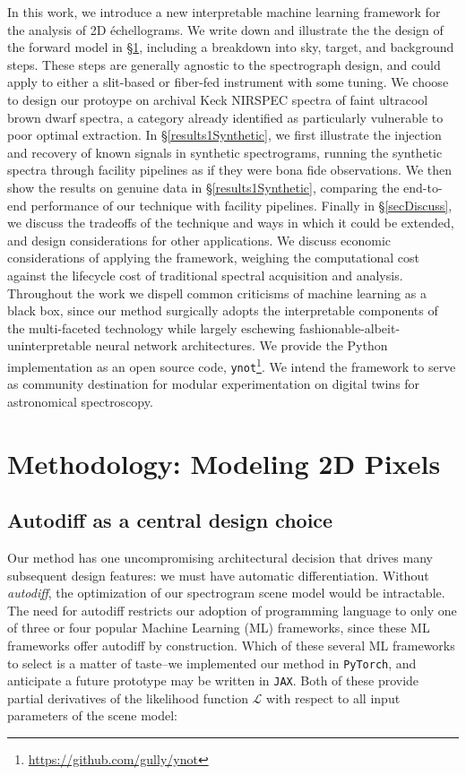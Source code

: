 \documentclass[twocolumn]{aastex63}
\begin{document}
In this work, we introduce a new interpretable machine learning framework for the analysis of 2D \'echellograms.  We write down and illustrate the the design of the forward model in \S \ref{secMethod}, including a breakdown into sky, target, and background steps.  These steps are generally agnostic to the spectrograph design, and could apply to either a slit-based or fiber-fed instrument with some tuning.  We choose to design our protoype on archival Keck NIRSPEC spectra of faint ultracool brown dwarf spectra, a category already identified as particularly vulnerable to poor optimal extraction.  In \S \ref{results1Synthetic}, we first illustrate the injection and recovery of known signals in synthetic spectrograms, running the synthetic spectra through facility pipelines as if they were bona fide observations.  We then show the results on genuine data in \S \ref{results1Synthetic}, comparing the end-to-end performance of our technique with facility pipelines.  Finally in \S \ref{secDiscuss}, we discuss the tradeoffs of the technique and ways in which it could be extended, and design considerations for other applications.  We discuss economic considerations of applying the framework, weighing the computational cost against the lifecycle cost of traditional spectral acquisition and analysis.  Throughout the work we dispell common criticisms of machine learning as a black box, since our method surgically adopts the interpretable components of the multi-faceted technology while largely eschewing fashionable-albeit-uninterpretable neural network architectures.  We provide the Python implementation as an open source code, \texttt{ynot}\footnote{\url{https://github.com/gully/ynot}}.  We intend the framework to serve as community destination for modular experimentation on digital twins for astronomical spectroscopy.


\section{Methodology: Modeling 2D Pixels} \label{secMethod}

\subsection{Autodiff as a central design choice}
Our method has one uncompromising architectural decision that drives many subsequent design features: we must have automatic differentiation.  Without \emph{autodiff}, the optimization of our spectrogram scene model would be intractable.  The need for autodiff restricts our adoption of programming language to only one of three or four popular Machine Learning (ML) frameworks, since these ML frameworks offer autodiff by construction.  Which of these several ML frameworks to select is a matter of taste--we implemented our method in \texttt{PyTorch}, and anticipate a future prototype may be written in \texttt{JAX}.  Both of these provide partial derivatives of the likelihood function $\mathcal{L}$ with respect to all input parameters of the scene model:
\end{document}
